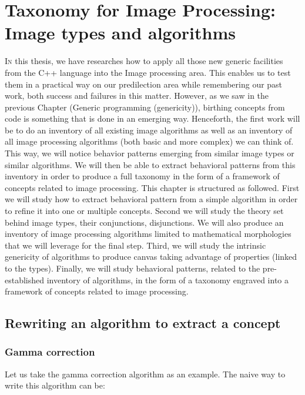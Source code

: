 \chapter{Taxonomy for Image Processing: Image types and algorithms}
\label{chap:image.algorithms.taxonomy}

\lettrine[lines=2]{I}{n} this thesis, we have researches how to apply all those new generic facilities from the C++
language into the Image processing area. This enables us to test them in a practical way on our predilection area while
remembering our past work, both success and failures in this matter. However, as we saw in the previous Chapter (Generic
programming (genericity)), birthing concepts from code is something that is done in an emerging way. Henceforth, the
first work will be to do an inventory of all existing image algorithms as well as an inventory of all image processing
algorithms (both basic and more complex) we can think of. This way, we will notice behavior patterns emerging from
similar image types or similar algorithms. We will then be able to extract behavioral patterns from this inventory in
order to produce a full taxonomy in the form of a framework of concepts related to image processing. This chapter is
structured as followed. First we will study how to extract behavioral pattern from a simple algorithm in order to refine
it into one or multiple concepts. Second we will study the theory set behind image types, their conjunctions,
disjunctions. We will also produce an inventory of image processing algorithms limited to mathematical morphologies that
we will leverage for the final step. Third, we will study the intrinsic genericity of algorithms to produce canvas
taking advantage of properties (linked to the types). Finally, we will study behavioral patterns, related to the
pre-established inventory of algorithms, in the form of a taxonomy engraved into a framework of concepts related to
image processing.

\section{Rewriting an algorithm to extract a concept}
\label{sec:rewriting}

\subsection{Gamma correction}
\label{subsec:gamma}

Let us take the gamma correction algorithm as an example. The naive way to write this algorithm can be:

